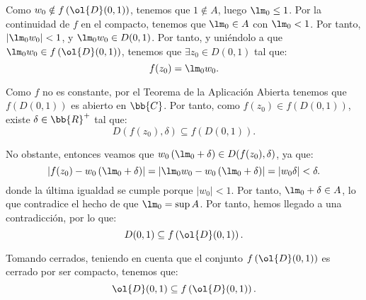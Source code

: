 \documentclass[12pt]{article}
\begin{document}
\begin{ejercicio}[2.5 puntos]
\begin{enumerate}
\begin{description}
                Como $w_0 \notin f\left(\ol{D}(0, 1)\right)$, tenemos que $1\notin A$, luego $\lm_0 \leq 1$. Por la continuidad de $f$ en el compacto, tenemos que $\lm_0\in A$ con $\lm_0 < 1$. Por tanto, $|\lm_0 w_0| < 1$, y $\lm_0 w_0 \in D(0, 1)$. Por tanto, y uniéndolo a que $\lm_0 w_0 \in f\left(\ol{D}(0, 1)\right)$, tenemos que $\exists z_0 \in D(0, 1)$ tal que:
                \begin{equation*}
                    f(z_0) = \lm_0 w_0.
                \end{equation*}

                Como $f$ no es constante, por el Teorema de la Aplicación Abierta tenemos que $f\left(D(0, 1)\right)$ es abierto en $\bb{C}$. Por tanto, como $f(z_0)\in f\left(D(0, 1)\right)$, existe $\delta\in \bb{R}^+$ tal que:
                \begin{equation*}
                    D(f(z_0), \delta) \subseteq f\left(D(0, 1)\right).
                \end{equation*}

                No obstante, entonces veamos que $w_0\left(\lm_0 + \delta\right)\in D(f(z_0), \delta)$, ya que:
                \begin{equation*}
                    \left|f(z_0) - w_0\left(\lm_0 + \delta\right)\right| = \left|\lm_0 w_0 - w_0\left(\lm_0 + \delta\right)\right| = |w_0\delta| < \delta.
                \end{equation*}
                donde la última igualdad se cumple porque $|w_0|<1$. Por tanto, $\lm_0+\delta \in A$, lo que contradice el hecho de que $\lm_0 = \sup A$. Por tanto, hemos llegado a una contradicción, por lo que:
                \begin{equation*}
                    D(0, 1) \subseteq f\left(\ol{D}(0, 1)\right).
                \end{equation*}

                Tomando cerrados, teniendo en cuenta que el conjunto $f\left(\ol{D}(0, 1)\right)$ es cerrado por ser compacto, tenemos que:
                \begin{equation*}
                    \ol{D}(0, 1) \subseteq f\left(\ol{D}(0, 1)\right).
                \end{equation*}
            \end{description}
        \end{enumerate}
    \end{ejercicio}
\end{document}
